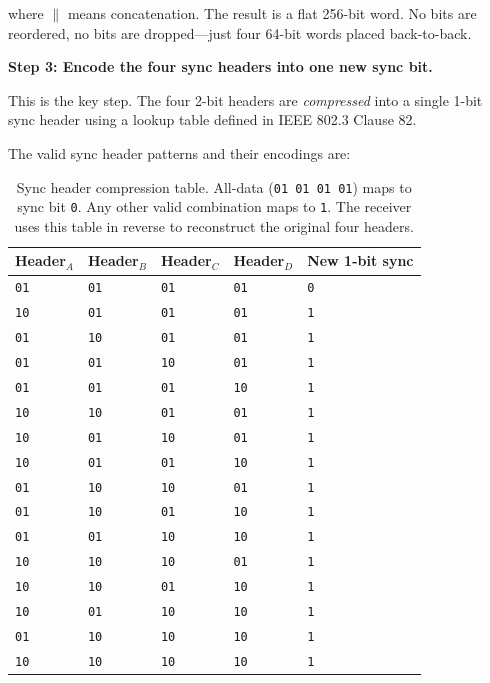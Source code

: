 \documentclass[openany]{tufte-book}
\begin{document}
where $\|$ means concatenation. The result is a flat 256-bit word. No bits are
reordered, no bits are dropped---just four 64-bit words placed back-to-back.

\textbf{Step 3: Encode the four sync headers into one new sync bit.}

This is the key step. The four 2-bit headers are \textit{compressed} into a
single 1-bit sync header using a lookup table defined in IEEE 802.3 Clause 82.

The valid sync header patterns and their encodings are:

\begin{fullwidth}
\begin{table}
\centering
\begin{tabular}{lllll}
\toprule
\textbf{Header$_A$} & \textbf{Header$_B$} & \textbf{Header$_C$} &
\textbf{Header$_D$} & \textbf{New 1-bit sync} \\
\midrule
\texttt{01} & \texttt{01} & \texttt{01} & \texttt{01} & \texttt{0} \\
\texttt{10} & \texttt{01} & \texttt{01} & \texttt{01} & \texttt{1} \\
\texttt{01} & \texttt{10} & \texttt{01} & \texttt{01} & \texttt{1} \\
\texttt{01} & \texttt{01} & \texttt{10} & \texttt{01} & \texttt{1} \\
\texttt{01} & \texttt{01} & \texttt{01} & \texttt{10} & \texttt{1} \\
\texttt{10} & \texttt{10} & \texttt{01} & \texttt{01} & \texttt{1} \\
\texttt{10} & \texttt{01} & \texttt{10} & \texttt{01} & \texttt{1} \\
\texttt{10} & \texttt{01} & \texttt{01} & \texttt{10} & \texttt{1} \\
\texttt{01} & \texttt{10} & \texttt{10} & \texttt{01} & \texttt{1} \\
\texttt{01} & \texttt{10} & \texttt{01} & \texttt{10} & \texttt{1} \\
\texttt{01} & \texttt{01} & \texttt{10} & \texttt{10} & \texttt{1} \\
\texttt{10} & \texttt{10} & \texttt{10} & \texttt{01} & \texttt{1} \\
\texttt{10} & \texttt{10} & \texttt{01} & \texttt{10} & \texttt{1} \\
\texttt{10} & \texttt{01} & \texttt{10} & \texttt{10} & \texttt{1} \\
\texttt{01} & \texttt{10} & \texttt{10} & \texttt{10} & \texttt{1} \\
\texttt{10} & \texttt{10} & \texttt{10} & \texttt{10} & \texttt{1} \\
\bottomrule
\end{tabular}
\caption{Sync header compression table. All-data (\texttt{01 01 01 01}) maps
to sync bit \texttt{0}. Any other valid combination maps to \texttt{1}. The
receiver uses this table in reverse to reconstruct the original four headers.}
\end{table}
\end{fullwidth}
\end{document}
